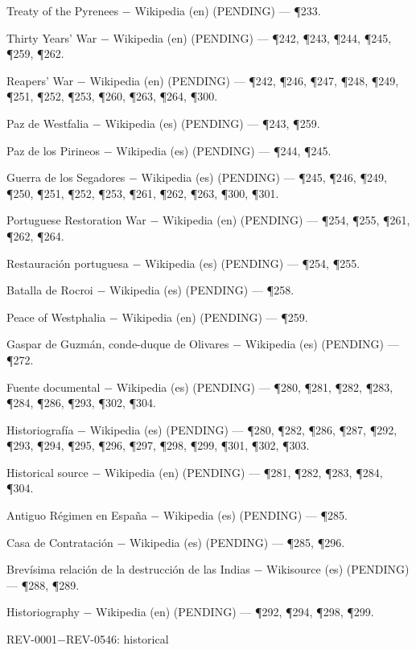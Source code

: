 \documentclass{book}
\begin{document}
\noindent Treaty of the Pyrenees \(-\) Wikipedia (en) (PENDING) --- \P233.

\noindent Thirty Years' War \(-\) Wikipedia (en) (PENDING) --- \P242, \P243, \P244, \P245, \P259, \P262.

\noindent Reapers' War \(-\) Wikipedia (en) (PENDING) --- \P242, \P246, \P247, \P248, \P249, \P251, \P252, \P253, \P260, \P263, \P264, \P300.

\noindent Paz de Westfalia \(-\) Wikipedia (es) (PENDING) --- \P243, \P259.

\noindent Paz de los Pirineos \(-\) Wikipedia (es) (PENDING) --- \P244, \P245.

\noindent Guerra de los Segadores \(-\) Wikipedia (es) (PENDING) --- \P245, \P246, \P249, \P250, \P251, \P252, \P253, \P261, \P262, \P263, \P300, \P301.

\noindent Portuguese Restoration War \(-\) Wikipedia (en) (PENDING) --- \P254, \P255, \P261, \P262, \P264.

\noindent Restauración portuguesa \(-\) Wikipedia (es) (PENDING) --- \P254, \P255.

\noindent Batalla de Rocroi \(-\) Wikipedia (es) (PENDING) --- \P258.

\noindent Peace of Westphalia \(-\) Wikipedia (en) (PENDING) --- \P259.

\noindent Gaspar de Guzmán, conde-duque de Olivares \(-\) Wikipedia (es) (PENDING) --- \P272.

\noindent Fuente documental \(-\) Wikipedia (es) (PENDING) --- \P280, \P281, \P282, \P283, \P284, \P286, \P293, \P302, \P304.

\noindent Historiografía \(-\) Wikipedia (es) (PENDING) --- \P280, \P282, \P286, \P287, \P292, \P293, \P294, \P295, \P296, \P297, \P298, \P299, \P301, \P302, \P303.

\noindent Historical source \(-\) Wikipedia (en) (PENDING) --- \P281, \P282, \P283, \P284, \P304.

\noindent Antiguo Régimen en España \(-\) Wikipedia (es) (PENDING) --- \P285.

\noindent Casa de Contratación \(-\) Wikipedia (es) (PENDING) --- \P285, \P296.

\noindent Brevísima relación de la destrucción de las Indias \(-\) Wikisource (es) (PENDING) --- \P288, \P289.

\noindent Historiography \(-\) Wikipedia (en) (PENDING) --- \P292, \P294, \P298, \P299.

\noindent REV-0001\(-\)REV-0546: historical
\end{document}
